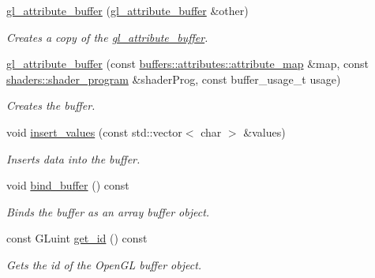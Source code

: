 \begin{DoxyCompactItemize}
\item 
\hyperlink{classoccluded_1_1opengl_1_1retained_1_1gl__attribute__buffer_ae5e26c840ef863b9c5ff3ce438cb83a0}{gl\+\_\+attribute\+\_\+buffer} (\hyperlink{classoccluded_1_1opengl_1_1retained_1_1gl__attribute__buffer}{gl\+\_\+attribute\+\_\+buffer} \&other)
\begin{DoxyCompactList}\small\item\em Creates a copy of the \hyperlink{classoccluded_1_1opengl_1_1retained_1_1gl__attribute__buffer}{gl\+\_\+attribute\+\_\+buffer}. \end{DoxyCompactList}\item 
\hyperlink{classoccluded_1_1opengl_1_1retained_1_1gl__attribute__buffer_a22cdc11d70684a364895715b12293487}{gl\+\_\+attribute\+\_\+buffer} (const \hyperlink{classoccluded_1_1buffers_1_1attributes_1_1attribute__map}{buffers\+::attributes\+::attribute\+\_\+map} \&map, const \hyperlink{classoccluded_1_1opengl_1_1retained_1_1shaders_1_1shader__program}{shaders\+::shader\+\_\+program} \&shader\+Prog, const buffer\+\_\+usage\+\_\+t usage)
\begin{DoxyCompactList}\small\item\em Creates the buffer. \end{DoxyCompactList}\item 
void \hyperlink{classoccluded_1_1opengl_1_1retained_1_1gl__attribute__buffer_afd58deefb5659c0cd9a316263515b68f}{insert\+\_\+values} (const std\+::vector$<$ char $>$ \&values)
\begin{DoxyCompactList}\small\item\em Inserts data into the buffer. \end{DoxyCompactList}\item 
void \hyperlink{classoccluded_1_1opengl_1_1retained_1_1gl__attribute__buffer_a0bc941bf7603a80ea249cd1d64cc2b67}{bind\+\_\+buffer} () const 
\begin{DoxyCompactList}\small\item\em Binds the buffer as an array buffer object. \end{DoxyCompactList}\item 
const G\+Luint \hyperlink{classoccluded_1_1opengl_1_1retained_1_1gl__attribute__buffer_ab23624ebadcabdcb0d028e2fe0039ffd}{get\+\_\+id} () const 
\begin{DoxyCompactList}\small\item\em Gets the id of the Open\+G\+L buffer object. \end{DoxyCompactList}\item 

\end{DoxyCompactItemize}
